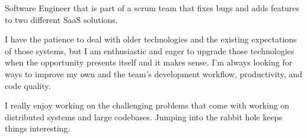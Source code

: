 

\begin{cvparagraph}
    Software Engineer that is part of a scrum team that fixes bugs and adds features to two different SaaS solutions.  

    I have the patience to deal with older technologies and the existing expectations of those systems,
    but I am enthusiastic and eager to upgrade those technologies when the opportunity presents itself and it makes sense.
    I’m always looking for ways to improve my own and the team's development workflow, productivity, and code quality. 

    I really enjoy working on the challenging problems that come with working on distributed systems and large codebases.
    Jumping into the rabbit hole keeps things interesting. 
\end{cvparagraph}
